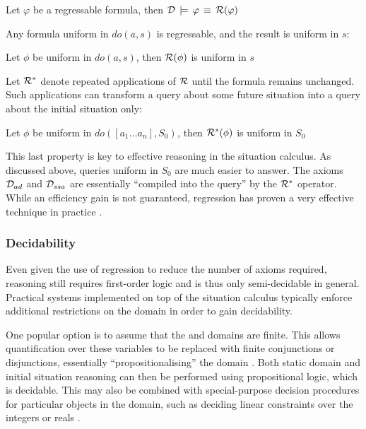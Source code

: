 \begin{prop}
Let $\varphi$ be a regressable formula, then $\mathcal{D}\,\models\,\varphi\,\equiv\,\mathcal{R}(\varphi)$ 
\end{prop}
Any formula uniform in $do(a,s)$ is regressable, and the result is
uniform in $s$:

\begin{prop}
Let $\phi$ be uniform in $do(a,s)$, then $\mathcal{R}(\phi)$ is uniform
in $s$ 
\end{prop}
Let $\mathcal{R}^{*}$ denote repeated applications of $\mathcal{R}$ until the
formula remains unchanged. Such applications can transform a query
about some future situation into a query about the initial situation
only:

\begin{prop}
Let $\phi$ be uniform in \emph{$do([a_{1}\dots a_{n}],S_{0})$,}
then $\mathcal{R}^{*}(\phi)$ is uniform in $S_{0}$ 
\end{prop}
This last property is key to effective reasoning in the situation
calculus. As discussed above, queries uniform in $S_{0}$ are much
easier to answer. The axioms $\mathcal{D}_{ad}$ and $\mathcal{D}_{ssa}$ are essentially
{}``compiled into the query'' by the $\mathcal{R}^{*}$ operator. While
an efficiency gain is not guaranteed, regression has proven a very
effective technique in practice \citep{levesque97golog,pirri99contributions_sitcalc}.


\subsubsection{Decidability}

Even given the use of regression to reduce the number of axioms required,
reasoning still requires first-order logic and is thus only semi-decidable
in general. Practical systems implemented on top of the situation
calculus typically enforce additional restrictions on the domain in
order to gain decidability.

One popular option is to assume that the  and 
domains are finite. This allows quantification over these variables
to be replaced with finite conjunctions or disjunctions, essentially
{}``propositionalising'' the domain \citep{giacomo99impl_robots,reiter01kia,levesque04krr_book}.
Both static domain and initial situation reasoning can then be performed
using propositional logic, which is decidable. This may also be combined
with special-purpose decision procedures for particular objects in
the domain, such as deciding linear constraints over the integers
or reals \citep{reiter96sc_nat_conc,reiter01kia}.

